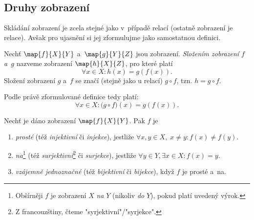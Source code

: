 \subsection{Druhy zobrazení}
Skládání zobrazení je zcela stejné jako v~případě relací (ostatně zobrazení je relace). Avšak pro ujasnění si jej zformulujme jako samostatnou definici.
\begin{definition}\label{def:skladani_zobrazeni}
    Nechť $\map{f}{X}{Y}$ a~$\map{g}{Y}{Z}$ jsou zobrazení. \emph{Složením zobrazení $f$ a~$g$} nazveme zobrazení $\map{h}{X}{Z}$, pro které platí
    \begin{equation*}
        \forall x\in X: h(x)=g(f(x)).
    \end{equation*}
    Složení zobrazení $g$ a~$f$ se značí (stejně jako u relací) $g\circ f$, tzn. $h=g \circ f$.
\end{definition}
Podle právě zformulované definice tedy platí:
\begin{equation*}
    \forall x\in X: \bigl(g\circ f\bigr)(x)=g(f(x)).
\end{equation*}
\needspace{1cm}
\begin{definition}\label{def:druhy_zobrazeni}
    Nechť je dáno zobrazení $\map{f}{X}{Y}$. Pak $f$ je
    \begin{enumerate}[label=(\roman*)]
        \item \emph{prosté} (též \emph{injektivní} či \emph{injekce}), jestliže $\forall x,y\in X,\;x\neq y: f(x)\neq f(y)$.
        \item \emph{na}\footnote{Obšírněji $f$ je zobrazení $X$ \emph{na} $Y$ (nikoliv \emph{do} $Y$), pokud platí uvedený výrok.} (též \emph{surjektivní}\footnote{Z francouzštiny, čteme "syrjektivní"/"syrjekce".} či \emph{surjekce}), jestliže $\forall y\in Y, \exists x\in X: f(x)=y$.
        \item \emph{vzájemně jednoznačné} (též \emph{bijektivní} či \emph{bijekce}), když $f$ je prosté a~na.
    \end{enumerate}
\end{definition}
